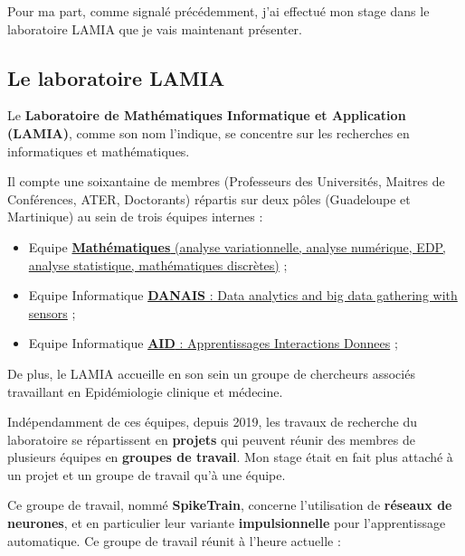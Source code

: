 Pour ma part, comme signalé précédemment, j'ai effectué mon stage dans
le laboratoire LAMIA que je vais maintenant présenter.

\hypertarget{le-lamia}{%
\subsection{Le laboratoire LAMIA}\label{le-lamia}}

Le \textbf{Laboratoire de Mathématiques Informatique et Application
(LAMIA)}, comme son nom l'indique, se concentre sur les recherches en
informatiques et mathématiques.

Il compte une soixantaine de membres (Professeurs des Universités,
Maitres de Conférences, ATER, Doctorants) répartis sur deux pôles
(Guadeloupe et Martinique) au sein de trois équipes internes :

\begin{itemize}
\tightlist
\item
  Equipe
  \href{http://lamia.univ-ag.fr/index.php?page=equipe-mathematiques}{\textbf{Mathématiques}
  (analyse variationnelle, analyse numérique, EDP, analyse statistique,
  mathématiques discrètes)} ;
\item
  Equipe Informatique
  \href{http://lamia.univ-ag.fr/index.php?page=equipe-danais}{\textbf{DANAIS}
  : Data analytics and big data gathering with sensors} ;
\item
  Equipe Informatique
  \href{http://lamia.univ-ag.fr/index.php?page=equipe-aid}{\textbf{AID}
  : Apprentissages Interactions Donnees} ;
\end{itemize}

De plus, le LAMIA accueille en son sein un groupe de chercheurs associés
travaillant en Epidémiologie clinique et médecine.


Indépendamment de ces équipes, depuis 2019, les travaux de recherche du
laboratoire  se répartissent en \textbf{projets} qui peuvent réunir des membres
de plusieurs équipes en \textbf{groupes de travail}.
Mon stage était en
fait plus attaché à un projet et un groupe de travail qu'à une équipe.

Ce groupe de travail, nommé \textbf{SpikeTrain}, concerne l'utilisation de
\textbf{réseaux de neurones}, et en particulier leur variante
\textbf{impulsionnelle} pour l'apprentissage automatique.
Ce groupe de travail réunit à l'heure actuelle :

